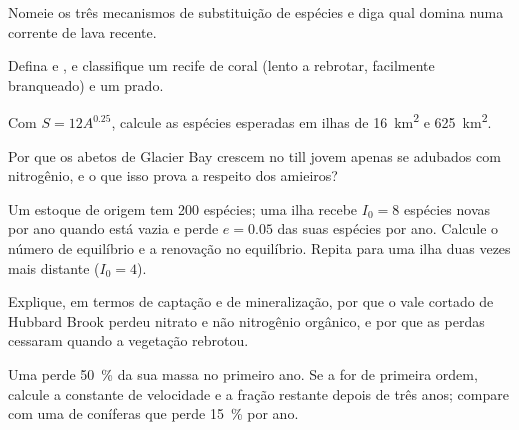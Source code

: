 \begin{exercise}[$\star$]\label{exo:b1:ecosystem-dynamics:2}
Nomeie os três mecanismos de substituição de espécies e diga qual
domina numa corrente de lava recente.
\end{exercise}

\begin{exercise}[$\star$]\label{exo:b1:ecosystem-dynamics:3}
Defina  e , e classifique um recife de coral
(lento a rebrotar, facilmente branqueado) e um prado.
\end{exercise}

\begin{exercise}[$\star$]\label{exo:b1:ecosystem-dynamics:4}
Com $S = 12 A^{0.25}$, calcule as espécies esperadas em ilhas de
\qty{16}{km^2} e \qty{625}{km^2}.
\end{exercise}

\begin{exercise}[$\star\star$]\label{exo:b1:ecosystem-dynamics:5}
Por que os abetos de Glacier Bay crescem no till jovem apenas se
adubados com nitrogênio, e o que isso prova a respeito dos amieiros?
\end{exercise}

\begin{exercise}[$\star\star$]\label{exo:b1:ecosystem-dynamics:6}
Um estoque de origem tem 200 espécies; uma ilha recebe $I_0 = 8$
espécies novas por ano quando está vazia e perde $e = 0.05$ das suas
espécies por ano. Calcule o número de equilíbrio e a renovação no
equilíbrio. Repita para uma ilha duas vezes mais distante ($I_0 = 4$).
\end{exercise}

\begin{exercise}[$\star\star$]\label{exo:b1:ecosystem-dynamics:7}
Explique, em termos de captação e de mineralização, por que o vale
cortado de Hubbard Brook perdeu nitrato e não nitrogênio orgânico, e
por que as perdas cessaram quando a vegetação rebrotou.
\end{exercise}

\begin{exercise}[$\star\star$]\label{exo:b1:ecosystem-dynamics:8}
Uma  perde \qty{50}{\%} da sua massa no primeiro ano. Se a
 for de primeira ordem, calcule a constante de velocidade
e a fração restante depois de três anos; compare com uma 
de coníferas que perde \qty{15}{\%} por ano.
\end{exercise}


